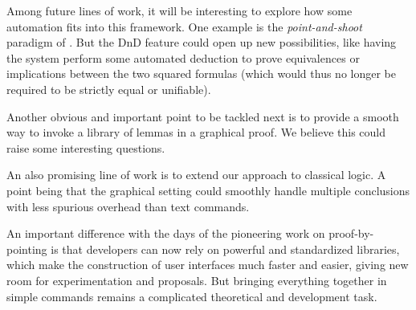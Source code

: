 Among future lines of work, it will be interesting to explore how some
automation fits into this framework. One example is the \emph{point-and-shoot}
paradigm of \cite{PbP}. But the DnD feature could open up new possibilities,
like having the system perform some automated deduction to prove equivalences or
implications between the two squared formulas (which would thus no longer be
required to be strictly equal or unifiable).

Another obvious and important point to be tackled next is to provide a
smooth way to invoke a library of lemmas in a graphical proof. We
believe this could raise some interesting questions.

An also promising line of work is to extend our approach to classical
logic. A point being that the graphical setting could smoothly handle
multiple conclusions with less spurious overhead than text commands.


An important difference with the days of the
pioneering work on proof-by-pointing is that developers can now rely on
powerful and standardized libraries, which make the construction of
user interfaces much faster and easier, giving new room for
experimentation and proposals. But bringing everything together in
simple commands remains a complicated theoretical and development task.